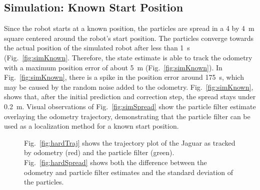 \documentclass[conference]{../IEEEtran}
\begin{document}
\subsection{Simulation: Known Start Position}

Since the robot starts at a known position, the particles are spread in a 4 by
\SI{4}{\meter} square centered around the robot's start position. The particles converge
towards the actual position of the simulated robot after less than \SI{1}{\second}
(Fig.~\ref{fig:simKnown}.  Therefore, the state estimate is able to track the odometry
with a maximum position error of about \SI{5}{\meter} (Fig.~\ref{fig:simKnown}).  In
Fig.~\ref{fig:simKnown}, there is a spike in the position error around \SI{175}{\second},
which may be caused by the random noise added to the odometry.  Fig.~\ref{fig:simKnown},
shows that, after the initial prediction and correction step, the spread stays under
\SI{0.2}{\meter}.  Visual observations of Fig.~\ref{fig:simSpread} show the particle
filter estimate overlaying the odometry trajectory, demonstrating that the particle filter
can be used as a localization method for a known start position.

\begin{figure}[t]
  \centering
  \hspace{.5 cm}
  \caption{Fig.~\ref{fig:hardTraj} shows the trajectory
  plot of the Jaguar as tracked by odometry (red) and the
  particle filter (green). Fig.~\ref{fig:hardSpread} shows
  both the difference between the odometry and particle
  filter estimates and the standard deviation of the particles.}
  \label{fig:hardware}
\end{figure}
\end{document}
